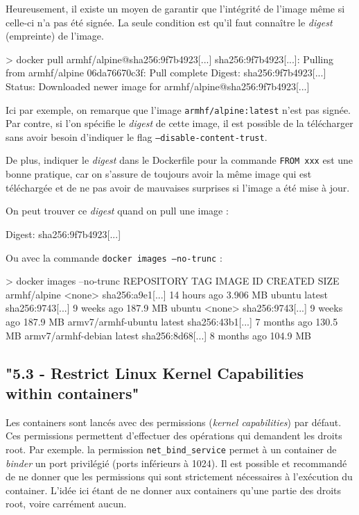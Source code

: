 \documentclass[11pt,a4paper,oneside]{report}
\newcommand{\code}[1]{\texttt{#1}}
\begin{document}
Heureusement, il existe un moyen de garantir que l'intégrité de l'image même si celle-ci n'a pas été signée. La seule condition est qu'il faut connaître le \textit{digest} (empreinte) de l'image.

\begin{textcode}
> docker pull armhf/alpine@sha256:9f7b4923[...]
sha256:9f7b4923[...]: Pulling from armhf/alpine
06da76670c3f: Pull complete
Digest: sha256:9f7b4923[...]
Status: Downloaded newer image for armhf/alpine@sha256:9f7b4923[...]
\end{textcode}

Ici par exemple, on remarque que l'image \code{armhf/alpine:latest} n'est pas signée. Par contre, si l'on spécifie le \textit{digest} de cette image, il est possible de la télécharger sans avoir besoin d'indiquer le flag \code{--disable-content-trust}.

De plus, indiquer le \textit{digest} dans le Dockerfile pour la commande \code{FROM xxx} est une bonne pratique, car on s'assure de toujours avoir la même image qui est téléchargée et de ne pas avoir de mauvaises surprises si l'image a été mise à jour.

On peut trouver ce \textit{digest} quand on pull une image :
\begin{textcode}
Digest: sha256:9f7b4923[...]
\end{textcode}

Ou avec la commande \code{docker images --no-trunc} :

\begin{textcode}
> docker images --no-trunc
REPOSITORY          TAG     IMAGE ID           CREATED        SIZE
armhf/alpine        <none>  sha256:a9e1[...]   14 hours ago   3.906 MB
ubuntu              latest  sha256:9743[...]   9 weeks ago    187.9 MB
ubuntu              <none>  sha256:9743[...]   9 weeks ago    187.9 MB
armv7/armhf-ubuntu  latest  sha256:43b1[...]   7 months ago   130.5 MB
armv7/armhf-debian  latest  sha256:8d68[...]   8 months ago   104.9 MB
\end{textcode}

\subsection{"5.3  - Restrict Linux Kernel Capabilities within containers"}\label{ss-restrict-kernel-capa}
Les containers sont lancés avec des permissions (\textit{kernel capabilities}) par défaut. Ces permissions permettent d'effectuer des opérations qui demandent les droits root. Par exemple. la permission \code{net\_bind\_service} permet à un container de \textit{binder} un port privilégié (ports inférieurs à 1024). Il est possible et recommandé de ne donner que les permissions qui sont strictement nécessaires à l'exécution du container. L'idée ici étant de ne donner aux containers qu'une partie des droits root, voire carrément aucun.
\end{document}
